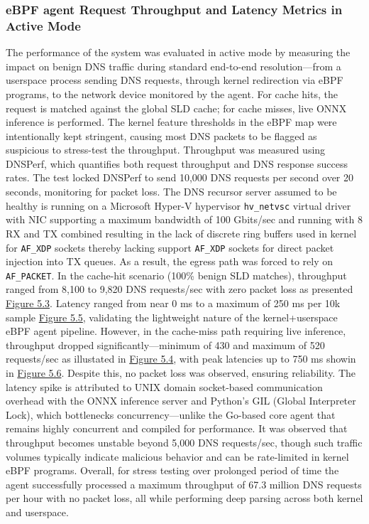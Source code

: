 \documentclass [11pt, proquest] {uwthesis}[2020/02/24]
\begin{document}
\subsubsection{eBPF agent Request Throughput and Latency Metrics in Active Mode}
The performance of the system was evaluated in active mode by measuring the impact on benign DNS traffic during standard end-to-end resolution—from a userspace process sending DNS requests, through kernel redirection via eBPF programs, to the network device monitored by the agent. For cache hits, the request is matched against the global SLD cache; for cache misses, live ONNX inference is performed. The kernel feature thresholds in the eBPF map were intentionally kept stringent, causing most DNS packets to be flagged as suspicious to stress-test the throughput. Throughput was measured using DNSPerf, which quantifies both request throughput and DNS response success rates. The test locked DNSPerf to send 10,000 DNS requests per second over 20 seconds, monitoring for packet loss. The DNS recursor server assumed to be healthy is running on a Microsoft Hyper-V hypervisor \texttt{hv\_netvsc} virtual driver with NIC supporting a maximum bandwidth of 100 Gbits/sec and running with 8 RX and TX combined resulting in the lack of discrete ring buffers used in kernel for \texttt{AF\_XDP} sockets thereby lacking support \texttt{AF\_XDP} sockets for direct packet injection into TX queues. As a result, the egress path was forced to rely on \texttt{AF\_PACKET}. In the cache-hit scenario (100\% benign SLD matches), throughput ranged from 8,100 to 9,820 DNS requests/sec with zero packet loss as presented \hyperref[fig:throughput_gsld]{Figure 5.3}. Latency ranged from near 0 ms to a maximum of 250 ms per 10k sample \hyperlink{fig:latency_gsld}{Figure 5.5}, validating the lightweight nature of the kernel+userspace eBPF agent pipeline. However, in the cache-miss path requiring live inference, throughput dropped significantly—minimum of 430 and maximum of 520 requests/sec as illustated in \hyperref[fig:throughput_onnx]{Figure 5.4}, with peak latencies up to 750 ms showin in \hyperref[fig:latency_onnx]{Figure 5.6}. Despite this, no packet loss was observed, ensuring reliability. The latency spike is attributed to UNIX domain socket-based communication overhead with the ONNX inference server and Python’s GIL (Global Interpreter Lock), which bottlenecks concurrency—unlike the Go-based core agent that remains highly concurrent and compiled for performance.
It was observed that throughput becomes unstable beyond 5,000 DNS requests/sec, though such traffic volumes typically indicate malicious behavior and can be rate-limited in kernel eBPF programs. Overall, for stress testing over prolonged period of time the agent successfully processed a maximum throughput of 67.3 million DNS requests per hour with no packet loss, all while performing deep parsing across both kernel and userspace.
\end{document}
